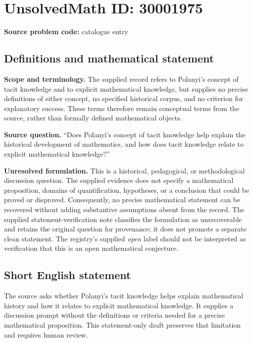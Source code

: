 \documentclass[11pt]{article}
\begin{document}
\section*{UnsolvedMath ID: 30001975}
\textbf{Source problem code:} catalogue entry
\subsection{Definitions and mathematical statement}
\textbf{Scope and terminology.} The supplied record refers to Polanyi's concept of tacit knowledge and to explicit mathematical knowledge, but supplies no precise definitions of either concept, no specified historical corpus, and no criterion for explanatory success. These terms therefore remain conceptual terms from the source, rather than formally defined mathematical objects.

\textbf{Source question.} ``Does Polanyi's concept of tacit knowledge help explain the historical development of mathematics, and how does tacit knowledge relate to explicit mathematical knowledge?''

\textbf{Unresolved formulation.} This is a historical, pedagogical, or methodological discussion question. The supplied evidence does not specify a mathematical proposition, domains of quantification, hypotheses, or a conclusion that could be proved or disproved. Consequently, no precise mathematical statement can be recovered without adding substantive assumptions absent from the record. The supplied statement-verification note classifies the formulation as unrecoverable and retains the original question for provenance; it does not promote a separate clean statement. The registry's supplied \emph{open} label should not be interpreted as verification that this is an open mathematical conjecture.
\subsection{Short English statement}
The source asks whether Polanyi's tacit knowledge helps explain mathematical history and how it relates to explicit mathematical knowledge. It supplies a discussion prompt without the definitions or criteria needed for a precise mathematical proposition. This statement-only draft preserves that limitation and requires human review.
\end{document}
